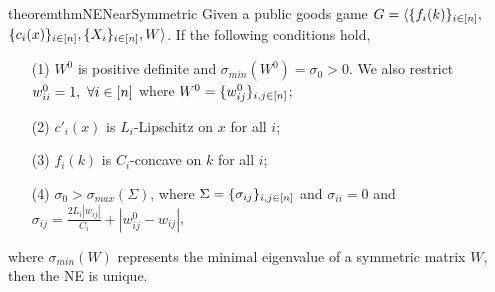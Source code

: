 \begin{restatable}{theorem}{thmNENearSymmetric}
\label{thm:NE:unique:near-symmetric}
Given a public goods game $G = \langle \{f_i(k)\}_{i\in[n]},$ $\{c_i(x)\}_{i\in[n]}, \{X_i\}_{i\in[n]}, W \rangle$. If the following conditions hold, 
\begin{itemize}
    \item[(1)] $W^0$ is positive definite and $\sigma_{min}(W^0) = \sigma_0 > 0$. We also restrict $w^0_{ii} = 1,\ \forall {i\in[n]}$ where $W^0 = \{w^0_{ij}\}_{i,j\in[n]}$;
    \item[(2)] $c'_i(x)$ is $L_i$-Lipschitz on $x$ for all $i$;
    \item[(3)] $f_i(k)$ is $C_i$-concave on $k$ for all $i$;
    \item[(4)] $\sigma_0 > \sigma_{max}(\Sigma)$, where $\Sigma = \{\sigma_{ij}\}_{i,j\in[n]}$ and $\sigma_{ii} = 0$ and $\sigma_{ij} = \frac{2L_i |w_{ij}|}{C_i} + |w^0_{ij} - w_{ij}|$,
\end{itemize}
where $\sigma_{min}(W)$ represents the minimal eigenvalue of a symmetric matrix $W$, then the NE is unique.
\end{restatable}